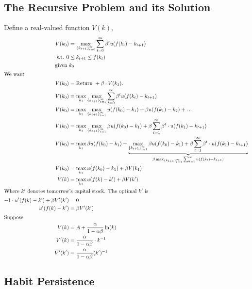 \documentclass[11pt]{article}
\begin{document}
\subsection{The Recursive Problem and its Solution}
\label{sec:org4777b09}
Define a real-valued function \(V(k)\),
\begin{align*}
V(k_0) &= \max_{\left\{k_{t + 1}\right\}^\infty_{t = 0}} \sum^\infty_{t = 0} \beta^t u(f(k_t) - k_{t + 1})\\
\text{s.t. } 0 &\le k_{t + 1} \le f(k_t)\\
\text{given } &k_0\\
\intertext{We want}
V(k_0) &= \text{Return } + \beta \cdot V(k_1).\\
V(k_0) &= \max_{k_1} \max_{\left\{k_{t + 1}\right\}^\infty_{t = 1}} \sum^\infty_{t = 0} \beta^t u(f(k_t) - k_{t + 1})\\
V(k_0) &= \max_{k_1} \max_{\left\{k_{t + 1}\right\}^\infty_{t = 1}} u (f(k_0) - k_1) + \beta u(f(k_1) - k_2) + \ldots\\
V(k_0) &= \max_{k_1} \max_{\left\{k_{t + 1}\right\}^\infty_{t = 1}} \beta u(f(k_0) - k_1) + \beta \sum^\infty_{t = 1} \beta^t \cdot u(f(k_1) - k_{t + 1})\\
V(k_0) &= \max_{k_1} \beta u(f(k_0) - k_1) + \underbrace{\max_{\left\{k_{t + 1}\right\}^\infty_{t = 1}} \beta u(f(k_0) - k_1) + \beta \sum^\infty_{t = 1} \beta^t \cdot u(f(k_1) - k_{t + 1})}_{\beta \max_{\{k_{t + 1}\}^\infty_{t = 1}} \sum^\infty_{t = 1} u(f(k_t) - k_{t + 1})}\\
V(k_0) &= \max_{k_1} u(f(k_0) - k_1) + \beta V(k_1)\\
V(k) &= \max_{k_1} u(f(k) - k') + \beta V(k')\\
\intertext{Where $k'$ denotes tomorrow's capital stock. The optimal $k'$ is}
-1\cdot u'(f(k) - k') + \beta V'(k') &= 0\\
u'(f(k) - k') &= \beta V'(k')\\
\intertext{Suppose}
V(k) &= A + \frac{\alpha}{1 - \alpha \beta} \ln(k)\\
V'(k) &= \frac{\alpha}{1 - \alpha \beta}\cdot k^{-1}\\
V'(k') &= \frac{\alpha}{1 - \alpha \beta} (k')^{-1}\\
\end{align*}

\subsection{Habit Persistence}
\label{sec:org9187251}
\end{document}
